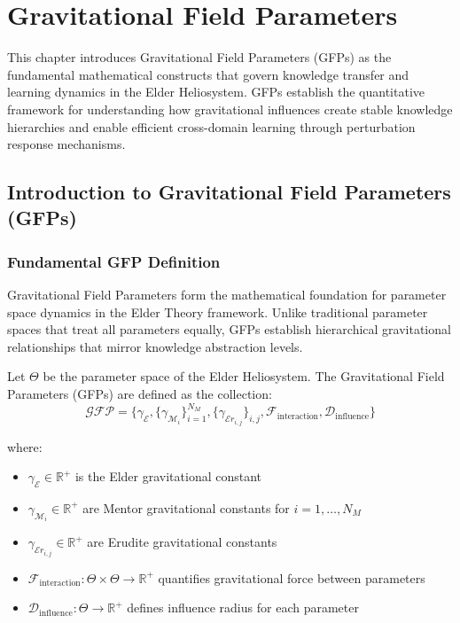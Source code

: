 \chapter{Gravitational Field Parameters}

\begin{tcolorbox}[colback=blue!5!white,colframe=blue!75!black,title=\textit{Chapter Summary}]
This chapter introduces Gravitational Field Parameters (GFPs) as the fundamental mathematical constructs that govern knowledge transfer and learning dynamics in the Elder Heliosystem. GFPs establish the quantitative framework for understanding how gravitational influences create stable knowledge hierarchies and enable efficient cross-domain learning through perturbation response mechanisms.
\end{tcolorbox}

\section{Introduction to Gravitational Field Parameters (GFPs)}

\subsection{Fundamental GFP Definition}

Gravitational Field Parameters form the mathematical foundation for parameter space dynamics in the Elder Theory framework. Unlike traditional parameter spaces that treat all parameters equally, GFPs establish hierarchical gravitational relationships that mirror knowledge abstraction levels.

\begin{definition}
\label{def:gravitational_field_parameters}
Let $\Theta$ be the parameter space of the Elder Heliosystem. The Gravitational Field Parameters (GFPs) are defined as the collection:
\begin{equation}
\mathcal{GFP} = \{\gamma_{\mathcal{E}}, \{\gamma_{\mathcal{M}_i}\}_{i=1}^{N_M}, \{\gamma_{\mathcal{E}r_{i,j}}\}_{i,j}, \mathcal{F}_{\text{interaction}}, \mathcal{D}_{\text{influence}}\}
\end{equation}

where:
\begin{itemize}
    \item $\gamma_{\mathcal{E}} \in \mathbb{R}^+$ is the Elder gravitational constant
    \item $\gamma_{\mathcal{M}_i} \in \mathbb{R}^+$ are Mentor gravitational constants for $i = 1, \ldots, N_M$
    \item $\gamma_{\mathcal{E}r_{i,j}} \in \mathbb{R}^+$ are Erudite gravitational constants
    \item $\mathcal{F}_{\text{interaction}}: \Theta \times \Theta \rightarrow \mathbb{R}^+$ quantifies gravitational force between parameters
    \item $\mathcal{D}_{\text{influence}}: \Theta \rightarrow \mathbb{R}^+$ defines influence radius for each parameter
\end{itemize}
\end{definition}

